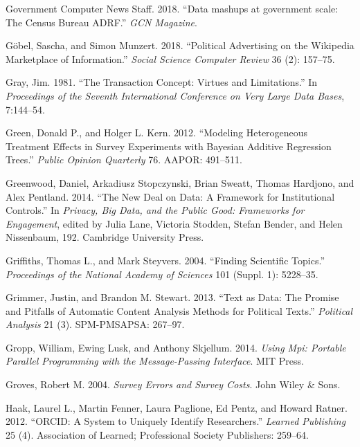 \documentclass[]{krantz}
\begin{document}
\hypertarget{ref-GovernmentComputerNewsStaff2018}{}
Government Computer News Staff. 2018. ``Data mashups at government
scale: The Census Bureau ADRF.'' \emph{GCN Magazine}.

\hypertarget{ref-Goebel2018}{}
Göbel, Sascha, and Simon Munzert. 2018. ``Political Advertising on the
Wikipedia Marketplace of Information.'' \emph{Social Science Computer
Review} 36 (2): 157--75.

\hypertarget{ref-gray1981transaction}{}
Gray, Jim. 1981. ``The Transaction Concept: Virtues and Limitations.''
In \emph{Proceedings of the Seventh International Conference on Very
Large Data Bases}, 7:144--54.

\hypertarget{ref-green2012modeling}{}
Green, Donald P., and Holger L. Kern. 2012. ``Modeling Heterogeneous
Treatment Effects in Survey Experiments with Bayesian Additive
Regression Trees.'' \emph{Public Opinion Quarterly} 76. AAPOR: 491--511.

\hypertarget{ref-greenwood2014}{}
Greenwood, Daniel, Arkadiusz Stopczynski, Brian Sweatt, Thomas Hardjono,
and Alex Pentland. 2014. ``The New Deal on Data: A Framework for
Institutional Controls.'' In \emph{Privacy, Big Data, and the Public
Good: Frameworks for Engagement}, edited by Julia Lane, Victoria
Stodden, Stefan Bender, and Helen Nissenbaum, 192. Cambridge University
Press.

\hypertarget{ref-griffiths-04}{}
Griffiths, Thomas L., and Mark Steyvers. 2004. ``Finding Scientific
Topics.'' \emph{Proceedings of the National Academy of Sciences} 101
(Suppl. 1): 5228--35.

\hypertarget{ref-grimmer2013text}{}
Grimmer, Justin, and Brandon M. Stewart. 2013. ``Text as Data: The
Promise and Pitfalls of Automatic Content Analysis Methods for Political
Texts.'' \emph{Political Analysis} 21 (3). SPM-PMSAPSA: 267--97.

\hypertarget{ref-mpi}{}
Gropp, William, Ewing Lusk, and Anthony Skjellum. 2014. \emph{Using Mpi:
Portable Parallel Programming with the Message-Passing Interface}. MIT
Press.

\hypertarget{ref-groves2004survey}{}
Groves, Robert M. 2004. \emph{Survey Errors and Survey Costs}. John
Wiley \& Sons.

\hypertarget{ref-haak2012orcid}{}
Haak, Laurel L., Martin Fenner, Laura Paglione, Ed Pentz, and Howard
Ratner. 2012. ``ORCID: A System to Uniquely Identify Researchers.''
\emph{Learned Publishing} 25 (4). Association of Learned; Professional
Society Publishers: 259--64.
\end{document}
